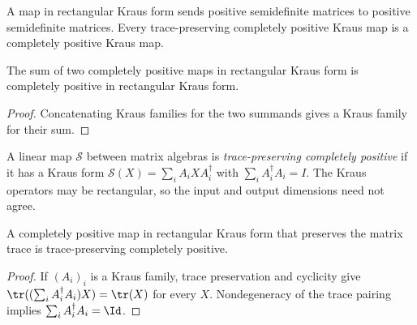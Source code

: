 \begin{lemma}
    \label{lem:is_kraus_cp_basic}
    \leanok
    A map in rectangular Kraus form sends positive semidefinite matrices to
    positive semidefinite matrices. Every trace-preserving completely positive
    Kraus map is a completely positive Kraus map.
\end{lemma}

\begin{lemma}
    \label{lem:is_kraus_cp_add}
    \leanok
    The sum of two completely positive maps in rectangular Kraus form is
    completely positive in rectangular Kraus form.
\end{lemma}

\begin{proof}\leanok
    Concatenating Kraus families for the two summands gives a Kraus family for
    their sum.
\end{proof}

\begin{definition}
    \label{def:is_kraus_cptp}
    \leanok
    A linear map $\mathcal{S}$ between matrix algebras is \emph{trace-preserving
        completely positive} if it has a Kraus form
    $\mathcal{S}(X)=\sum_i A_iXA_i^\dagger$ with
    $\sum_i A_i^\dagger A_i=I$. The Kraus operators may be rectangular, so the
    input and output dimensions need not agree.
\end{definition}

\begin{theorem}
    \label{thm:is_kraus_cptp_of_is_kraus_cp_trace_preserving}
    \leanok
    A completely positive map in rectangular Kraus form that preserves the
    matrix trace is trace-preserving completely positive.
\end{theorem}

\begin{proof}\leanok
    If $(A_i)_i$ is a Kraus family, trace preservation and cyclicity give
    $\tr((\sum_i A_i^\dagger A_i)X)=\tr(X)$ for every $X$.
    Nondegeneracy of the trace pairing implies
    $\sum_i A_i^\dagger A_i=\Id$.
\end{proof}

